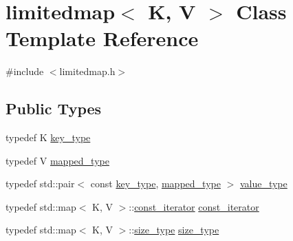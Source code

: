 \hypertarget{classlimitedmap}{}\section{limitedmap$<$ K, V $>$ Class Template Reference}
\label{classlimitedmap}


{\ttfamily \#include $<$limitedmap.\+h$>$}

\subsection*{Public Types}
\begin{DoxyCompactItemize}
\item 
typedef K \mbox{\hyperlink{classlimitedmap_aebf71255c65df699225cdcefe88717b9}{key\+\_\+type}}
\item 
typedef V \mbox{\hyperlink{classlimitedmap_a8bd6b8e7f91f0a141c91c382b492c03c}{mapped\+\_\+type}}
\item 
typedef std\+::pair$<$ const \mbox{\hyperlink{classlimitedmap_aebf71255c65df699225cdcefe88717b9}{key\+\_\+type}}, \mbox{\hyperlink{classlimitedmap_a8bd6b8e7f91f0a141c91c382b492c03c}{mapped\+\_\+type}} $>$ \mbox{\hyperlink{classlimitedmap_a8a6c4972e628b71bf43eeb757dafdce5}{value\+\_\+type}}
\item 
typedef std\+::map$<$ K, V $>$\+::\mbox{\hyperlink{classlimitedmap_ab0a3e4f2ec7c82359300c83a35ae2500}{const\+\_\+iterator}} \mbox{\hyperlink{classlimitedmap_ab0a3e4f2ec7c82359300c83a35ae2500}{const\+\_\+iterator}}
\item 
typedef std\+::map$<$ K, V $>$\+::\mbox{\hyperlink{classlimitedmap_a1c564b323f94e182e56aa27975e5f9d1}{size\+\_\+type}} \mbox{\hyperlink{classlimitedmap_a1c564b323f94e182e56aa27975e5f9d1}{size\+\_\+type}}
\end{DoxyCompactItemize}

